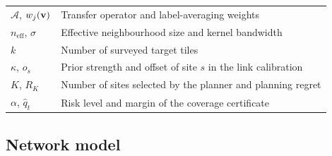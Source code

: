\begin{table}[!tp]
\begin{tabular}{ll}
$\mathcal{A}$, $w_j(\mathbf{v})$ & Transfer operator and label-averaging weights \\
$n_{\mathrm{eff}}$, $\sigma$ & Effective neighbourhood size and kernel bandwidth \\
$k$ & Number of surveyed target tiles \\
$\kappa$, $o_s$ & Prior strength and offset of site $s$ in the link calibration \\
$K$, $R_K$ & Number of sites selected by the planner and planning regret \\
$\alpha$, $\hat q_t$ & Risk level and margin of the coverage certificate \\
\bottomrule
\end{tabular}
\end{table}

\subsection{Network model}
\label{sec:netmodel}

